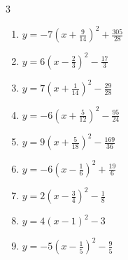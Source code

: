 \begin{multicols}{3}
\begin{enumerate}

  \item $\displaystyle y=-7\left( x+\frac{9}{14}\right)^{2}+\frac{305}{28}$


  \item $\displaystyle y=6\left( x-\frac{2}{3}\right)^{2}-\frac{17}{3}$


\columnbreak %

  \item $\displaystyle y=7\left( x+\frac{1}{14}\right)^{2}-\frac{29}{28}$


  \item $\displaystyle y=-6\left( x+\frac{5}{12}\right)^{2}-\frac{95}{24}$


  \item $\displaystyle y=9\left( x+\frac{5}{18}\right)^{2}-\frac{169}{36}$


  \item $\displaystyle y=-6\left( x-\frac{1}{6}\right)^{2}+\frac{19}{6}$


  \item $\displaystyle y=2\left( x-\frac{3}{4}\right)^{2}-\frac{1}{8}$


  \item $\displaystyle y=4\left( x-1\right)^{2}-3$

        \phantom{$\displaystyle 頂点\left( 1 , -3 \right)$}

  \item $\displaystyle y=-5\left( x-\frac{1}{5}\right)^{2}-\frac{9}{5}$



\end{enumerate}
\end{multicols}
